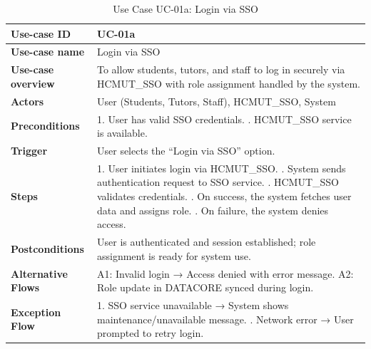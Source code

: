 \begin{table}[h!]
\centering
\begin{tabular}{|p{3cm}|p{11cm}|}
\hline
\textbf{Use-case ID} & UC-01a \\
\hline
\textbf{Use-case name} & Login via SSO \\
\hline
\textbf{Use-case overview} & To allow students, tutors, and staff to log in securely via HCMUT\_SSO with role assignment handled by the system. \\
\hline
\textbf{Actors} & User (Students, Tutors, Staff), HCMUT\_SSO, System \\
\hline
\textbf{Preconditions} & 
1. User has valid SSO credentials. \newline
2. HCMUT\_SSO service is available. \\
\hline
\textbf{Trigger} & User selects the ``Login via SSO'' option. \\
\hline
\textbf{Steps} & 
1. User initiates login via HCMUT\_SSO. \newline
2. System sends authentication request to SSO service. \newline
3. HCMUT\_SSO validates credentials. \newline
4. On success, the system fetches user data and assigns role. \newline
5. On failure, the system denies access. \\
\hline
\textbf{Postconditions} & User is authenticated and session established; role assignment is ready for system use. \\
\hline
\textbf{Alternative Flows} & 
A1: Invalid login → Access denied with error message. \newline
A2: Role update in DATACORE synced during login. \\
\hline
\textbf{Exception Flow} & 
1. SSO service unavailable → System shows maintenance/unavailable message. \newline
2. Network error → User prompted to retry login. \\
\hline
\end{tabular}
\caption{Use Case UC-01a: Login via SSO}
\end{table}



